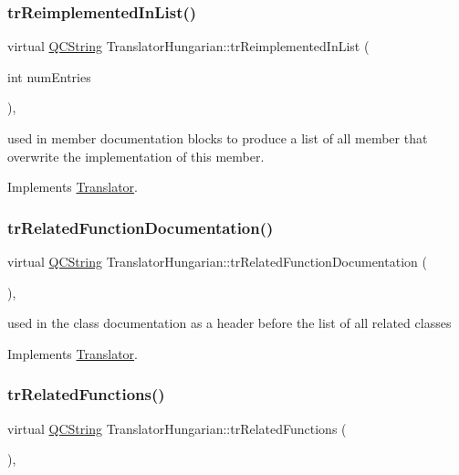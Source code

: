 \subsubsection{\texorpdfstring{trReimplementedInList()}{trReimplementedInList()}}
{\footnotesize\ttfamily virtual \mbox{\hyperlink{class_q_c_string}{Q\+C\+String}} Translator\+Hungarian\+::tr\+Reimplemented\+In\+List (\begin{DoxyParamCaption}\item[{int}]{num\+Entries }\end{DoxyParamCaption})\hspace{0.3cm}{\ttfamily [inline]}, {\ttfamily [virtual]}}

used in member documentation blocks to produce a list of all member that overwrite the implementation of this member. 

Implements \mbox{\hyperlink{class_translator}{Translator}}.

\mbox{\label{class_translator_hungarian_a976b9f7a52b58b09db80cf548596fd84}} 
\subsubsection{\texorpdfstring{trRelatedFunctionDocumentation()}{trRelatedFunctionDocumentation()}}
{\footnotesize\ttfamily virtual \mbox{\hyperlink{class_q_c_string}{Q\+C\+String}} Translator\+Hungarian\+::tr\+Related\+Function\+Documentation (\begin{DoxyParamCaption}{ }\end{DoxyParamCaption})\hspace{0.3cm}{\ttfamily [inline]}, {\ttfamily [virtual]}}

used in the class documentation as a header before the list of all related classes 

Implements \mbox{\hyperlink{class_translator}{Translator}}.

\mbox{\label{class_translator_hungarian_af3d50e509d40c05402a8d9a7c3dafb95}} 
\subsubsection{\texorpdfstring{trRelatedFunctions()}{trRelatedFunctions()}}
{\footnotesize\ttfamily virtual \mbox{\hyperlink{class_q_c_string}{Q\+C\+String}} Translator\+Hungarian\+::tr\+Related\+Functions (\begin{DoxyParamCaption}{ }\end{DoxyParamCaption})\hspace{0.3cm}{\ttfamily [inline]}, {\ttfamily [virtual]}}


